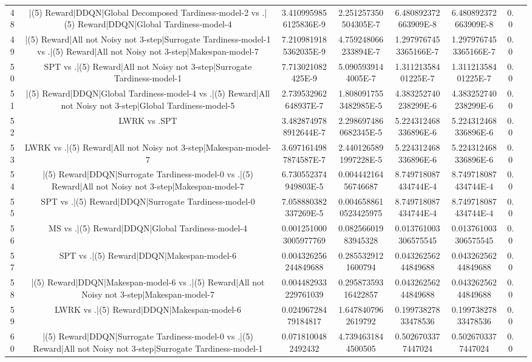 \documentclass[a3paper,10pt]{article}
\begin{document}
\begin{table}[!htp]
\begin{tabular}{cccccccc}
48&|(5) Reward|DDQN|Global Decomposed Tardiness-model-2 vs .|(5) Reward|DDQN|Global Tardiness-model-4&3.4109959856125836E-9&2.251257350504305E-7&6.480892372663909E-8&6.480892372663909E-8&0.0\\
49&|(5) Reward|All not Noisy not 3-step|Surrogate Tardiness-model-1 vs .|(5) Reward|All not Noisy not 3-step|Makespan-model-7&7.2109819185362035E-9&4.759248066233894E-7&1.2979767453365166E-7&1.2979767453365166E-7&0.0\\
50&SPT vs .|(5) Reward|All not Noisy not 3-step|Surrogate Tardiness-model-1&7.713021082425E-9&5.0905939144005E-7&1.31121358401225E-7&1.31121358401225E-7&0.0\\
51&|(5) Reward|DDQN|Global Tardiness-model-4 vs .|(5) Reward|All not Noisy not 3-step|Global Tardiness-model-5&2.739532962648937E-7&1.8080917553482985E-5&4.383252740238299E-6&4.383252740238299E-6&0.0\\
52&LWRK vs .SPT&3.4828749788912644E-7&2.2986974860682345E-5&5.224312468336896E-6&5.224312468336896E-6&0.0\\
53&LWRK vs .|(5) Reward|All not Noisy not 3-step|Makespan-model-7&3.6971614987874587E-7&2.4401265891997228E-5&5.224312468336896E-6&5.224312468336896E-6&0.0\\
54&|(5) Reward|DDQN|Surrogate Tardiness-model-0 vs .|(5) Reward|All not Noisy not 3-step|Makespan-model-7&6.730552374949803E-5&0.00444216456746687&8.749718087434744E-4&8.749718087434744E-4&0.0\\
55&SPT vs .|(5) Reward|DDQN|Surrogate Tardiness-model-0&7.058880382337269E-5&0.0046588610523425975&8.749718087434744E-4&8.749718087434744E-4&0.0\\
56&MS vs .|(5) Reward|DDQN|Global Tardiness-model-4&0.0012510003005977769&0.08256601983945328&0.013761003306575545&0.013761003306575545&0.0\\
57&SPT vs .|(5) Reward|DDQN|Makespan-model-6&0.004326256244849688&0.2855329121600794&0.04326256244849688&0.04326256244849688&0.0\\
58&|(5) Reward|DDQN|Makespan-model-6 vs .|(5) Reward|All not Noisy not 3-step|Makespan-model-7&0.004482933229761039&0.29587359316422857&0.04326256244849688&0.04326256244849688&0.0\\
59&LWRK vs .|(5) Reward|DDQN|Makespan-model-6&0.02496728479184817&1.6478407962619792&0.19973827833478536&0.19973827833478536&0.0\\
60&|(5) Reward|DDQN|Surrogate Tardiness-model-0 vs .|(5) Reward|All not Noisy not 3-step|Surrogate Tardiness-model-1&0.0718100482492432&4.7394631844500505&0.5026703377447024&0.5026703377447024&0.0\\

\end{tabular}
\end{table}
\end{document}
